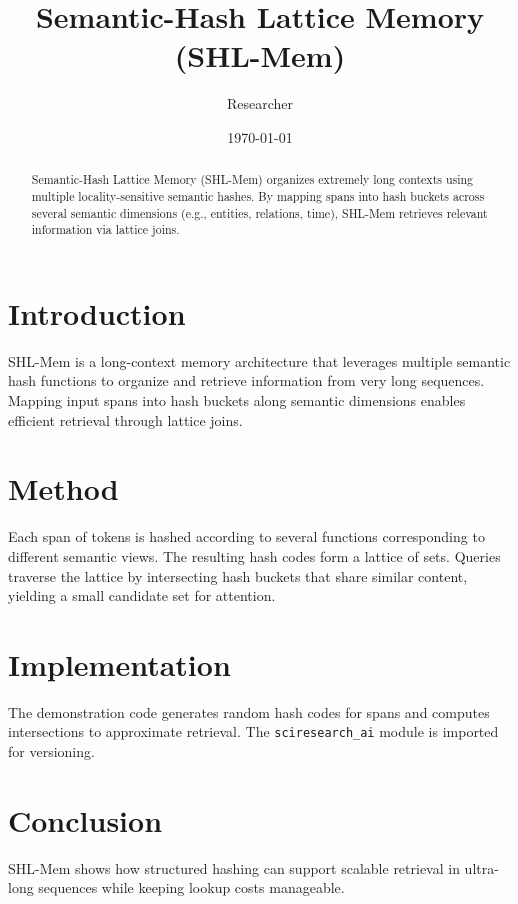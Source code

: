 \documentclass{article}
\title{Semantic-Hash Lattice Memory (SHL-Mem)}
\author{Researcher}
\date{\today}
\begin{document}
\maketitle

\begin{abstract}
Semantic-Hash Lattice Memory (SHL-Mem) organizes extremely long
contexts using multiple locality-sensitive semantic hashes. By mapping
spans into hash buckets across several semantic dimensions (e.g.,
entities, relations, time), SHL-Mem retrieves relevant information via
lattice joins.
\end{abstract}

\section{Introduction}
SHL-Mem is a long-context memory architecture that leverages multiple
semantic hash functions to organize and retrieve information from very
long sequences. Mapping input spans into hash buckets along semantic
dimensions enables efficient retrieval through lattice joins.

\section{Method}
Each span of tokens is hashed according to several functions
corresponding to different semantic views. The resulting hash codes
form a lattice of sets. Queries traverse the lattice by intersecting
hash buckets that share similar content, yielding a small candidate set
for attention.

\section{Implementation}
The demonstration code generates random hash codes for spans and
computes intersections to approximate retrieval. The
\texttt{sciresearch\_ai} module is imported for versioning.

\section{Conclusion}
SHL-Mem shows how structured hashing can support scalable retrieval in
ultra-long sequences while keeping lookup costs manageable.
\end{document}
